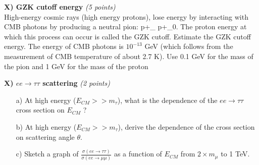 {\textbf{X)  GZK cutoff energy} \hfill \textit{(5 points)}\\
High-energy cosmic rays (high energy protons), lose energy by interacting with CMB photons by producing a neutral pion:
\be
p+\gamma_{} \rightarrow p+\pi_0.
\ee
The proton energy at which this process can occur is called the GZK cutoff. 
Estimate the GZK cutoff energy.
The energy of CMB photons is $10^{-13}$ GeV (which follows from the measurement of CMB temperature of about 2.7 K).
Use 0.1 GeV for the mass of the pion and 1 GeV for the mass of the proton
\vspace{5in}







\textbf{X) $ee\rightarrow\tau\tau$ scattering } \hfill \textit{(2 points)}\\
\begin{itemize}
\item[a)]{
At high energy ($E_{CM} >> m_\tau$), what is the dependence of the $ee\rightarrow\tau\tau$ cross section on $E_{CM}$ ?
}

\item[b)]{
At high energy ($E_{CM} >> m_\tau$), derive the dependence of the cross section on scattering angle $\theta$.
}

\item[c)]{
Sketch a graph of $\frac{\sigma(ee\rightarrow\tau\tau)}{\sigma(ee\rightarrow\mu\mu)}$ as a function of $E_{CM}$ from $2\times m_{\mu}$ to 1 TeV.
}
\end{itemize}





}
